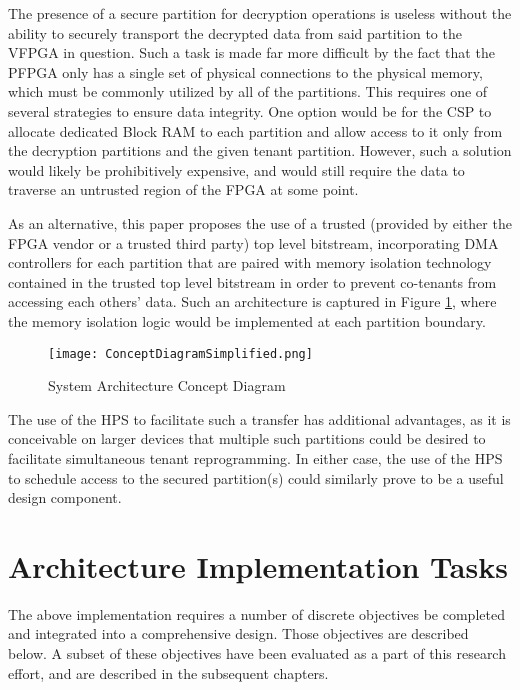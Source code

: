 The presence of a secure partition for decryption operations is useless without the ability to securely transport the decrypted data from said partition to the VFPGA in question. Such a task is made far more difficult by the fact that the PFPGA only has a single set of physical connections to the physical memory, which must be commonly utilized by all of the partitions. This requires one of several strategies to ensure data integrity. One option would be for the CSP to allocate dedicated Block RAM to each partition and allow access to it only from the decryption partitions and the given tenant partition. However, such a solution would likely be prohibitively expensive, and would still require the data to traverse an untrusted region of the FPGA at some point.

As an alternative, this paper proposes the use of a trusted (provided by either the FPGA vendor or a trusted third party) top level bitstream, incorporating DMA controllers for each partition that are paired with memory isolation technology contained in the trusted top level bitstream in order to prevent co-tenants from accessing each others' data. Such an architecture is captured in Figure \ref{fig:topLevelDesign}, where the memory isolation logic would be implemented at each partition boundary.

\begin{figure}
  \centering
  \texttt{[image: ConceptDiagramSimplified.png]}
  \caption{System Architecture Concept Diagram}
  \label{fig:topLevelDesign}
\end{figure}

The use of the HPS to facilitate such a transfer has additional advantages, as it is conceivable on larger devices that multiple such partitions could be desired to facilitate simultaneous tenant reprogramming. In either case, the use of the HPS to schedule access to the secured partition(s) could similarly prove to be a useful design component.

\section{Architecture Implementation Tasks}\label{subsec:Obj}
The above implementation requires a number of discrete objectives be completed and integrated into a comprehensive design. Those objectives are described below. A subset of these objectives have been evaluated as a part of this research effort, and are described in the subsequent chapters.

